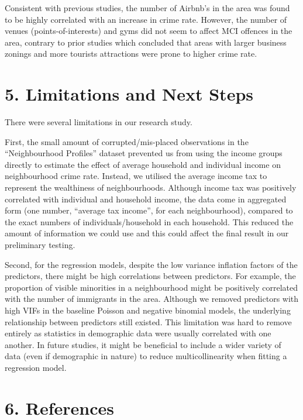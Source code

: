 \documentclass[
]{article}
\begin{document}
Consistent with previous studies, the number of Airbnb's in the area was
found to be highly correlated with an increase in crime rate. However,
the number of venues (points-of-interests) and gyms did not seem to
affect MCI offences in the area, contrary to prior studies which
concluded that areas with larger business zonings and more tourists
attractions were prone to higher crime rate.

\hypertarget{limitations-and-next-steps}{%
\section{5. Limitations and Next
Steps}\label{limitations-and-next-steps}}

There were several limitations in our research study.

First, the small amount of corrupted/mis-placed observations in the
``Neighbourhood Profiles'' dataset prevented us from using the income
groups directly to estimate the effect of average household and
individual income on neighbourhood crime rate. Instead, we utilised the
average income tax to represent the wealthiness of neighbourhoods.
Although income tax was positively correlated with individual and
household income, the data come in aggregated form (one number,
``average tax income'', for each neighbourhood), compared to the exact
numbers of individuals/household in each household. This reduced the
amount of information we could use and this could affect the final
result in our preliminary testing.

Second, for the regression models, despite the low variance inflation
factors of the predictors, there might be high correlations between
predictors. For example, the proportion of visible minorities in a
neighbourhood might be positively correlated with the number of
immigrants in the area. Although we removed predictors with high VIFs in
the baseline Poisson and negative binomial models, the underlying
relationship between predictors still existed. This limitation was hard
to remove entirely as statistics in demographic data were usually
correlated with one another. In future studies, it might be beneficial
to include a wider variety of data (even if demographic in nature) to
reduce multicollinearity when fitting a regression model.

\hypertarget{references}{%
\section{6. References}\label{references}}
\end{document}
